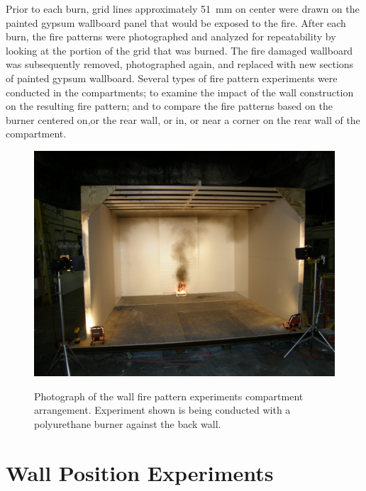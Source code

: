 \documentclass[twoside]{uocthesis}
\begin{document}
Prior to each burn, grid lines approximately 51~mm on center were drawn on the painted gypsum wallboard panel that would be exposed to the fire.  After each burn, the fire patterns were photographed and analyzed for repeatability by looking at the portion of the grid that was burned. The fire damaged wallboard was subsequently removed, photographed again, and replaced with new sections of painted gypsum wallboard. Several types of fire pattern experiments were conducted in the compartments; to examine the impact of the wall construction on the resulting fire pattern; and to compare the fire patterns based on the burner centered on,or the rear wall, or in, or near a corner on the rear wall of the compartment.

\begin{figure}[ht!]
\includegraphics[width=\columnwidth]{../Figures/Compartment_Test} \\
	\caption[Photograph of the wall fire pattern experiments compartment arrangement]{Photograph of the wall fire pattern experiments compartment arrangement.  Experiment shown is being conducted with a polyurethane burner against the back wall.}
	\label{Compartment_Test}
\end{figure}


\section{Wall Position Experiments}
\end{document}
